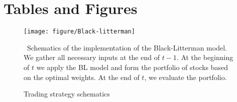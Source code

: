 \documentclass{article}\usepackage[]{graphicx}\usepackage[]{color}
\begin{document}


\appendix

\section{Tables and Figures}

\begin{figure}[ht]
\begin{center}
\texttt{[image: figure/Black-litterman]}
\end{center}
\caption{Trading strategy schematics}
\label{fig:bl}
\ Schematics of the implementation of the Black-Litterman model. We gather all necessary inputs at the end of  $t-1$. At the beginning of $t$ we apply the BL model and form the portfolio of stocks based on the optimal weights. At the end of $t$, we evaluate the portfolio.
\end{figure}
\end{document}
